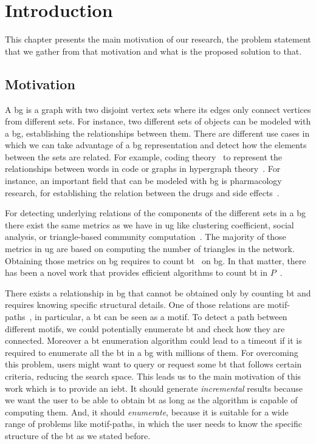 \chapter{Introduction}\label{intro}
This chapter presents the main motivation of our research, the problem statement that we gather from that motivation
and what is the proposed solution to that.

\section{Motivation}\label{sec:motivation}
A \acrfull{bg} is a graph with two disjoint vertex sets where its edges only connect vertices from different sets. 
For instance, two different sets of objects can be modeled with a \acrshort{bg}, establishing the relationships between them.
There are different use cases in which we can take advantage of a \acrshort{bg} representation and detect how the elements between the sets
are related. For example, coding theory~\cite{DBLP:journals/corr/WangL13} to represent the relationships between words in code or graphs in hypergraph theory~\cite{hypergraph}. 
For instance, an important field that can be modeled with \acrshort{bg} is pharmacology research, for establishing the relation between the drugs and side effects~\cite{drugs}.

For detecting underlying relations of the components of the different sets in a \acrshort{bg} there exist the same metrics as we have in \acrfull{ug} like clustering coefficient, social analysis, or triangle-based community computation~\cite{ccoef,detect_graph,Newman_2003}.
The majority of those metrics in \acrshort{ug} are based on computing the number of triangles in the network. Obtaining those metrics on \acrshort{bg} requires to count \acrfull{bt}~\cite{opsahl} on \acrshort{bg}.
In that matter, there has been a novel work that provides efficient algorithms to count \acrshort{bt} in $P$~\cite{btcount}.

There exists a relationship in \acrshort{bg} that cannot be obtained only by counting \acrshort{bt} and requires knowing specific
structural details. One of those relations are motif-paths~\cite{Li2019MotifPA}, in particular, a \acrshort{bt} can be seen as a motif. To detect a path between different motifs, we could potentially enumerate \acrshort{bt} and check how they are connected.
Moreover a \acrshort{bt} enumeration algorithm could lead to a timeout if it is required to enumerate all the \acrshort{bt} in a \acrshort{bg} with millions of them. For overcoming this problem, users might want to query or request some \acrshort{bt} that follows certain criteria, reducing the search space. 
This leads us to the main motivation of this work which is to provide an \acrfull{iebt}. It should generate \emph{incremental} results because we want the user to be able to obtain \acrshort{bt} as long as the algorithm is capable of computing them. 
And, it should \emph{enumerate}, because it is suitable for a wide range of problems like motif-paths, in which the user needs to know the specific structure of the \acrshort{bt} as we stated before.

